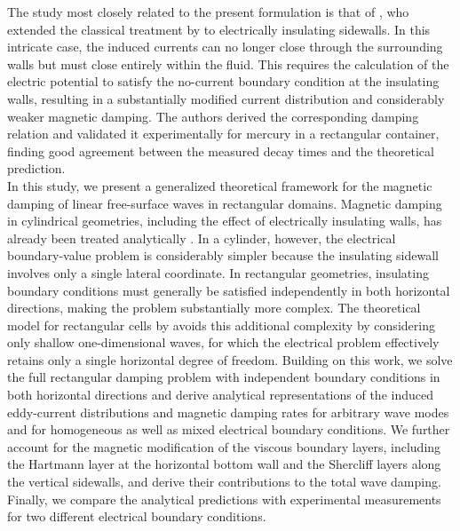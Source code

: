 \documentclass[aps,prfluids,reprint,superscriptaddress]{revtex4-2}
\begin{document}
The study most closely related to the present formulation is that of \citet{Sreenivasan2005}, who extended the classical treatment by \citet{Fraenkel1960} to electrically insulating sidewalls. In this intricate case, the induced currents can no longer close through the surrounding walls but must close entirely within the fluid. This requires the calculation of the electric potential to satisfy the no-current boundary condition at the insulating walls, resulting in a substantially modified current distribution and considerably weaker magnetic damping. The authors derived the corresponding damping relation and validated it experimentally for mercury in a rectangular container, finding good agreement between the measured decay times and the theoretical prediction.
\\
\indent In this study, we present a generalized theoretical framework for the magnetic damping of linear free-surface waves in rectangular domains. Magnetic damping in cylindrical geometries, including the effect of electrically insulating walls, has already been treated analytically \cite{Herreman2019,Krastins2020}.
In a cylinder, however, the electrical boundary-value problem is considerably simpler because the insulating sidewall involves only a single lateral coordinate. In rectangular geometries, insulating boundary conditions must generally be satisfied independently in both horizontal directions, making the problem substantially more complex. The theoretical model for rectangular cells by \citet{Sreenivasan2005} avoids this additional complexity by considering only shallow one-dimensional waves, for which the electrical problem effectively retains only a single horizontal degree of freedom. Building on this work, we solve the full rectangular damping problem with independent boundary conditions in both horizontal directions and derive analytical representations of the induced eddy-current distributions and magnetic damping rates for arbitrary wave modes and for homogeneous as well as mixed electrical boundary conditions.
We further account for the magnetic modification of the viscous boundary layers, including the Hartmann layer at the horizontal bottom wall and the Shercliff layers along the vertical sidewalls, and derive their contributions to the total wave damping. Finally, we compare the analytical predictions with experimental measurements for two different electrical boundary conditions.
\\
\end{document}
